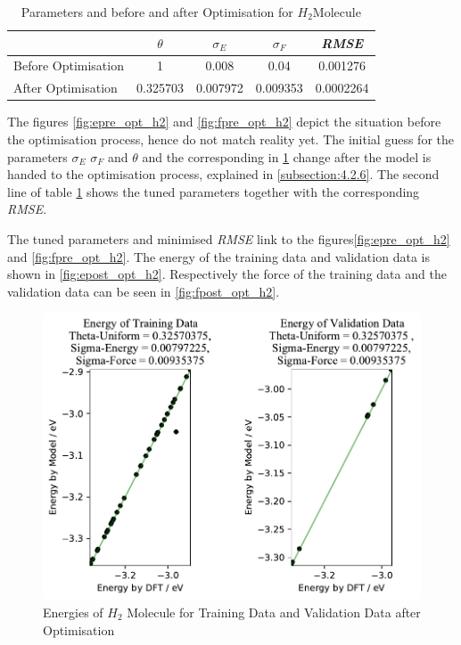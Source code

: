 \begin{table}
\centering
  \begin{tabular}{|l|c|c|c|c|}
    \hline
     & $\theta$ & $\sigma_E$ & $\sigma_F$  & \textit{RMSE} \\
    \hline
    Before Optimisation & 1 & 0.008 & 0.04 & 0.001276 \\
    After Optimisation &  0.325703 & 0.007972 &  0.009353 & 0.0002264 \\
    \hline
  \end{tabular}
\caption{Parameters and  before and after Optimisation for $H_2$Molecule}
\label{tab:h2params}
\end{table}



The figures \ref{fig:epre_opt_h2} and \ref{fig:fpre_opt_h2} depict the situation before the optimisation process, hence do not match reality yet. The initial guess for the parameters $\sigma_E$ $\sigma_F$ and $\theta$  and the corresponding  in \ref{tab:h2params} change after the model is handed to the optimisation process, explained in \ref{subsection:4.2.6}. The second line of table \ref{tab:h2params} shows the tuned  parameters together with the corresponding \textit{RMSE}.



The tuned parameters and minimised \textit{RMSE} link to the figures\ref{fig:epre_opt_h2}  and \ref{fig:fpre_opt_h2}. The energy of the training data and validation data is shown in \ref{fig:epost_opt_h2}. Respectively the force of the training data and the validation data can be seen in \ref{fig:fpost_opt_h2}.


\begin{figure}
	\includegraphics{../Bilder/Opt_Energies_H2.pdf}
	\caption{Energies of $H_2$ Molecule for Training Data and Validation Data after Optimisation}
	\label{epost_opt_h2}
\end{figure}


